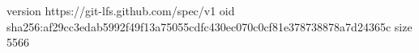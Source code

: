 version https://git-lfs.github.com/spec/v1
oid sha256:af29cc3edab5992f49f13a75055cdfc430ec070c0cf81e378738878a7d24365c
size 5566
